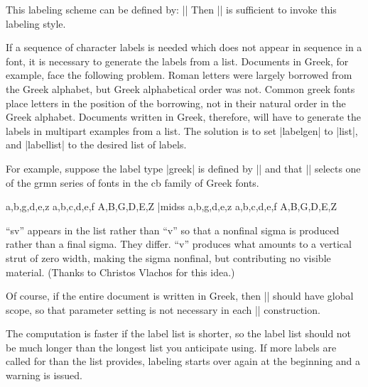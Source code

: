 This labeling scheme can be defined by:
\medskip
\noindent
||
\medskip
\noindent Then |\pex[labeltype=greekmath]| is sufficient to
invoke this labeling style.

If a sequence of character labels is needed which does not appear
in sequence in a font, it is necessary to generate the labels
from a list.  Documents in Greek, for example, face the following
problem.  Roman letters were largely borrowed from the Greek
alphabet, but Greek alphabetical order was not.  Common greek
fonts place letters in the position of the borrowing, not in
their natural order in the Greek alphabet.  Documents written in
Greek, therefore, will have to generate the labels in multipart
examples from a list. The solution is to set |labelgen| to
|list|, and |labellist| to the desired list of labels.

For example, suppose the label type |greek| is defined by
\medskip
\noindent ||
\medskip
\noindent and that |\gr| selects one of the grmn series of fonts
in the cb family of Greek fonts.

\begingroup
\gr


\beginss
\gr
\pex[labeltype=greek]
\a a,b,g,d,e,z
\a a,b,c,d,e,f
\a A,B,G,D,E,Z
\xe|midss
\pex[labeltype=greek]
\a a,b,g,d,e,z
\a a,b,c,d,e,f
\a A,B,G,D,E,Z
\xe
\endss
\endgroup

\noindent ``sv'' appears in the list rather than ``v'' so that a
nonfinal sigma is produced rather than a final sigma.  They
differ.  ``v'' produces what amounts to a vertical strut of zero
width, making the sigma nonfinal, but contributing no visible
material. (Thanks to Christos Vlachos for this idea.)

Of course, if the entire document is written in Greek, then
\medskip
\noindent ||
\medskip
\noindent should have global scope, so that parameter
setting is not necessary in each |\pex| construction.

The computation is faster if the label list is shorter, so
the label list should not be much longer than the longest list
you anticipate using.  If more labels are called for than the
list provides, labeling starts over again at the beginning and a
warning is issued.

